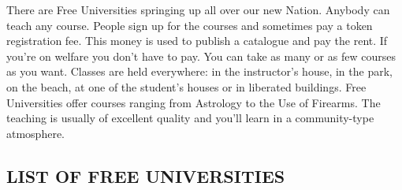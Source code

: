 \documentclass[11pt,twoside,a4paper]{book}
\begin{document}
There are Free Universities springing up all over our new Nation. Anybody can teach any course. People sign up for the courses and sometimes pay a token registration fee. This money is used to publish a catalogue and pay the rent. If you're on welfare you don't have to pay. You can take as many or as few courses as you want. Classes are held everywhere: in the instructor's house, in the park, on the beach, at one of the student's houses or in liberated buildings. Free Universities offer courses ranging from Astrology to the Use of Firearms. The teaching is usually of excellent quality and you'll learn in a community-type atmosphere.

\subsection{LIST OF FREE UNIVERSITIES}
\end{document}
